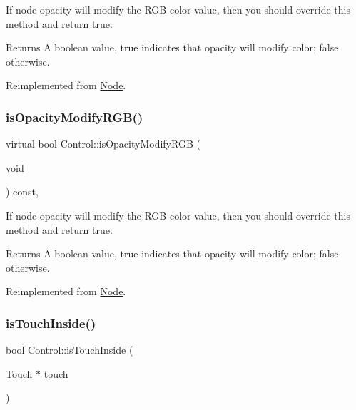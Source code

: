 If node opacity will modify the R\+GB color value, then you should override this method and return true. \begin{DoxyReturn}{Returns}
A boolean value, true indicates that opacity will modify color; false otherwise. 
\end{DoxyReturn}


Reimplemented from \hyperlink{classNode_ae6ce32d2088e2bb3426608334f1091c5}{Node}.

\mbox{\label{classControl_ac49bc0859aade4ad1ab6311941b4207a}} 
\subsubsection{\texorpdfstring{is\+Opacity\+Modify\+R\+G\+B()}{isOpacityModifyRGB()}\hspace{0.1cm}{\footnotesize\ttfamily [2/2]}}
{\footnotesize\ttfamily virtual bool Control\+::is\+Opacity\+Modify\+R\+GB (\begin{DoxyParamCaption}\item[{void}]{ }\end{DoxyParamCaption}) const\hspace{0.3cm}{\ttfamily [override]}, {\ttfamily [virtual]}}

If node opacity will modify the R\+GB color value, then you should override this method and return true. \begin{DoxyReturn}{Returns}
A boolean value, true indicates that opacity will modify color; false otherwise. 
\end{DoxyReturn}


Reimplemented from \hyperlink{classNode_ae6ce32d2088e2bb3426608334f1091c5}{Node}.

\mbox{\label{classControl_a897865e3e4ff50ed827f33966e786c7f}} 
\subsubsection{\texorpdfstring{is\+Touch\+Inside()}{isTouchInside()}\hspace{0.1cm}{\footnotesize\ttfamily [1/2]}}
{\footnotesize\ttfamily bool Control\+::is\+Touch\+Inside (\begin{DoxyParamCaption}\item[{\hyperlink{classTouch}{Touch} $\ast$}]{touch }\end{DoxyParamCaption})\hspace{0.3cm}{\ttfamily [virtual]}}

